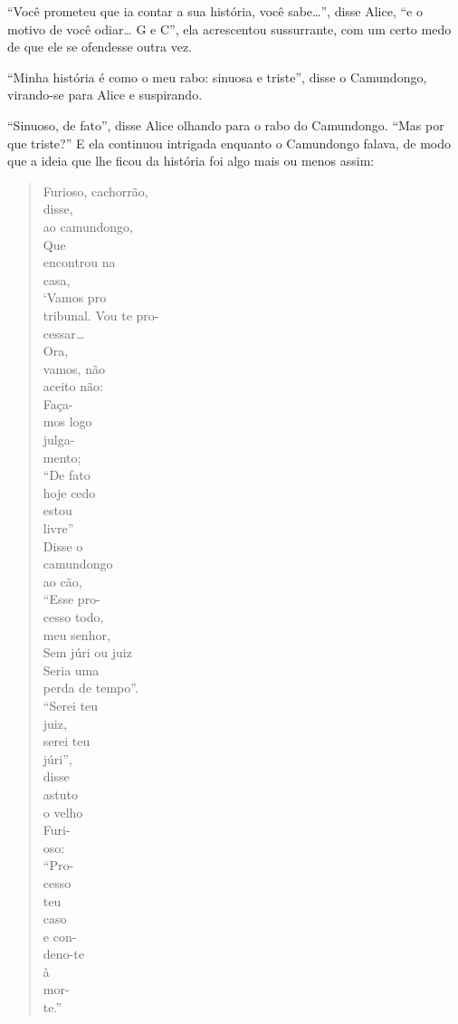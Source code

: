 ``Você prometeu que ia contar a sua história, você sabe\ldots{}'', disse
Alice, ``e o motivo de você odiar\ldots{} G e C'', ela acrescentou
sussurrante, com um certo medo de que ele se ofendesse outra vez.

``Minha história é como o meu rabo: sinuosa e triste'', disse o
Camundongo, virando-se para Alice e suspirando.

``Sinuoso, de fato'', disse Alice olhando para o rabo do Camundongo.
``Mas por que triste?'' E ela continuou intrigada enquanto o Camundongo
falava, de modo que a ideia que lhe ficou da história foi algo mais ou
menos assim:

\begin{quote}
Furioso, cachorrão,\\
disse,\\
ao camundongo,\\
Que\\
encontrou na\\
casa,\\`Vamos pro\\
tribunal. Vou te pro-\\
cessar\ldots{}\\
Ora,\\
vamos, não\\
aceito não:\\
Faça-\\
mos logo\\
julga-\\
mento;\\
``De fato\\
hoje cedo\\
estou\\
livre''\\
Disse o\\
camundongo\\
ao cão,\\
``Esse pro-\\
cesso todo,\\
meu senhor,\\
Sem júri ou juiz\\
Seria uma\\
perda de tempo''.\\
``Serei teu\\
juiz,\\
serei teu\\
júri'',\\
disse\\
astuto\\
o velho\\
Furi-\\
oso:\\
``Pro-\\
cesso\\
teu\\
caso\\
e con-\\
deno-te\\
à\\
mor-\\
te.''
\end{quote}

